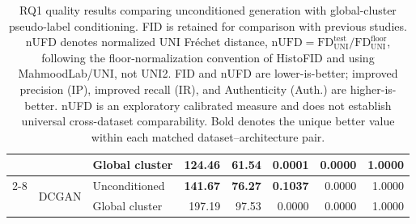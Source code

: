 \begin{table}[htbp]
\begin{tabular}{lllrrrrr}
 &  & Global cluster & \textbf{124.46} & \textbf{61.54} & \textbf{0.0001} & 0.0000 & 1.0000 \\
\cmidrule(lr){2-8}
 & \multirow{2}{*}{DCGAN} & Unconditioned & \textbf{141.67} & \textbf{76.27} & \textbf{0.1037} & 0.0000 & 1.0000 \\
 &  & Global cluster & 197.19 & 97.53 & 0.0000 & 0.0000 & 1.0000 \\
\bottomrule
\end{tabular}
\caption{RQ1 quality results comparing unconditioned generation with global-cluster pseudo-label conditioning. FID is retained for comparison with previous studies. nUFD denotes normalized UNI Fr\'echet distance, $\mathrm{nUFD}=\mathrm{FD}^{\mathrm{test}}_{\mathrm{UNI}}/\mathrm{FD}^{\mathrm{floor}}_{\mathrm{UNI}}$, following the floor-normalization convention of HistoFID and using MahmoodLab/UNI, not UNI2. FID and nUFD are lower-is-better; improved precision (IP), improved recall (IR), and Authenticity (Auth.) are higher-is-better. nUFD is an exploratory calibrated measure and does not establish universal cross-dataset comparability. Bold denotes the unique better value within each matched dataset--architecture pair.}
\label{tab:rq1-normalized-quality}
\end{table}
